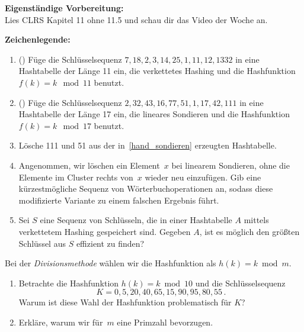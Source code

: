 \documentclass{uebung_cs}
\begin{document}
\textbf{Eigenständige Vorbereitung:}\\
Lies  CLRS Kapitel 11 ohne 11.5 und schau dir das  Video der Woche an.

\textbf{Zeichenlegende:}
\legende{}


\begin{aufgabe}\label{tue-first}\mbox{}
	\begin{enumerate}
		\item (\warmup) Füge die Schlüsselsequenz $7, 18, 2, 3, 14, 25, 1, 11, 12, 1332$ in eine Hashtabelle der Länge 11 ein, die verkettetes Hashing und die Hashfunktion $f(k) = k \mod 11$ benutzt.
		      \item\label{hand_sondieren} (\warmup) Füge die Schlüsselsequenz $2, 32, 43, 16, 77, 51, 1, 17, 42, 111$ in eine Hashtabelle der Länge 17 ein, die lineares Sondieren und die Hashfunktion $f(k) = k \mod 17$ benutzt.
		\item Lösche 111 und 51 aus der in~\ref{hand_sondieren} erzeugten Hashtabelle.
		      \item\label{wrong_delete} Angenommen, wir löschen ein Element~$x$ bei linearem Sondieren, ohne die Elemente im Cluster rechts von~$x$ wieder neu einzufügen.
		      Gib eine kürzestmögliche Sequenz von Wörterbuchoperationen an, sodass diese modifizierte Variante zu einem falschen Ergebnis führt.
		\item Sei $S$ eine Sequenz von Schlüsseln, die in einer Hashtabelle $A$ mittels verkettetem Hashing gespeichert sind.
		      Gegeben $A$, ist es möglich den größten Schlüssel aus $S$ effizient zu finden?
	\end{enumerate}
\end{aufgabe}

\begin{aufgabe}
	Bei der \emph{Divisionsmethode} wählen wir die Hashfunktion als $h(k)=k\bmod m$.
	\begin{enumerate}
		\item Betrachte die Hashfunktion $h(k) = k \bmod 10$ und die Schlüsselsequenz \[K = 0, 5, 20, 40, 65, 15, 90, 95, 80, 55\,.\] Warum ist diese Wahl der Hashfunktion problematisch für $K$?
		\item Erkläre, warum wir für~$m$ eine Primzahl bevorzugen.
	\end{enumerate}
\end{aufgabe}
\end{document}
